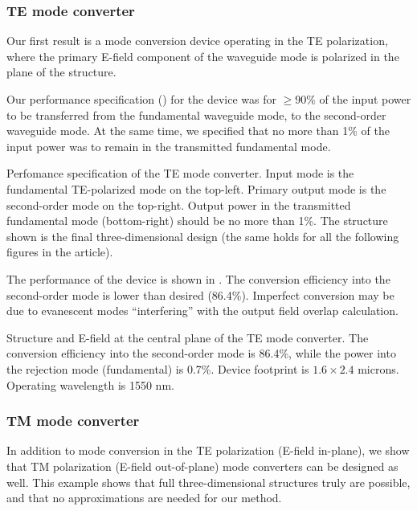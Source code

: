 \subsubsection{TE mode converter}
Our first result is a mode conversion device operating in the TE polarization,
    where the primary E-field component
    of the waveguide mode is polarized in the plane of the structure.

Our performance specification () 
    for the device was for $\ge90\%$ of the 
    input power to be transferred from the fundamental waveguide mode,
    to the second-order waveguide mode.
At the same time, we specified that no more than 1\% of the input power
    was to remain in the transmitted fundamental mode.

    {Perfomance specification of the TE mode converter.
    Input mode is the fundamental TE-polarized mode on the top-left.
    Primary output mode is the second-order mode on the top-right.
    Output power in the transmitted fundamental mode (bottom-right) 
    should be no more than 1\%.
    The structure shown is the final three-dimensional design
    (the same holds for all the following figures in the article).
    }

The performance of the device is shown in .
The conversion efficiency into the second-order mode is lower
    than desired (86.4\%). 
Imperfect conversion may be due to evanescent modes ``interfering'' 
    with the output field overlap calculation.

    {Structure and E-field at the central plane of the TE mode converter.
    The conversion efficiency into the second-order mode is 86.4\%,
    while the power into the rejection mode (fundamental) is 0.7\%.
    Device footprint is $1.6\times2.4$ microns.
    Operating wavelength is 1550 nm.}


\subsubsection{TM mode converter}

In addition to mode conversion in the TE polarization (E-field in-plane),
    we show that TM polarization (E-field out-of-plane) mode converters
    can be designed as well.
This example shows that full three-dimensional structures 
    truly are possible,
    and that no approximations are needed for our method.

